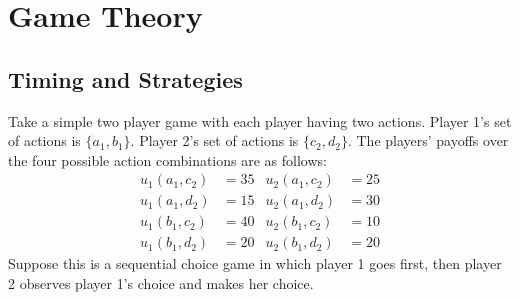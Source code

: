 \section{Game Theory}
\subsection{Timing and Strategies}

\noindent Take a simple two player game with each player having two actions. Player 1's set of actions is $\{a_1,b_1\}$. Player 2's set of actions is $\{c_2,d_2\}$. The players' payoffs over the four possible action combinations are as follows:
\begin{align*}
u_1(a_1,c_2) &= 35 & u_2(a_1,c_2) &= 25\\
u_1(a_1,d_2) &= 15 & u_2(a_1,d_2) &= 30\\
u_1(b_1,c_2) &= 40 & u_2(b_1,c_2) &= 10\\
u_1(b_1,d_2) &= 20 & u_2(b_1,d_2) &= 20
\end{align*}
Suppose this is a sequential choice game in which player 1 goes first, then player 2 observes player 1's choice and makes her choice.

